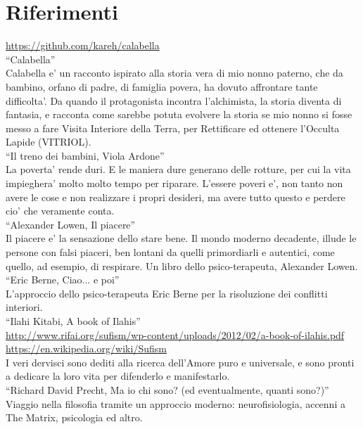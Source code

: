 \chapter{Riferimenti}
\label{chapRiferimenti}

  \url{https://github.com/kareh/calabella}\\
  ``Calabella''\\
  Calabella e' un racconto ispirato alla storia vera di mio nonno paterno, che da bambino, orfano di padre, di famiglia povera, ha dovuto affrontare tante difficolta'. Da quando il protagonista incontra l'alchimista, la storia diventa di fantasia, e racconta come sarebbe potuta evolvere la storia se mio nonno si fosse messo a fare Visita Interiore della Terra, per Rettificare ed ottenere l'Occulta Lapide (VITRIOL).\\

  ``Il treno dei bambini, Viola Ardone''\\
  La poverta' rende duri. E le maniera dure generano delle rotture, per cui la vita impieghera'
  molto molto tempo per riparare. L'essere poveri e', non tanto non avere le cose e non realizzare
  i propri desideri, ma avere tutto questo e perdere cio' che veramente conta.\\

  ``Alexander Lowen, Il piacere''\\
  Il piacere e' la sensazione dello stare bene. Il mondo moderno decadente, illude le persone
  con falsi piaceri, ben lontani da quelli primordiarli e autentici, come quello, ad esempio,
  di respirare. Un libro dello psico-terapeuta, Alexander Lowen.\\
  
  ``Eric Berne, Ciao... e poi''\\
  L'approccio dello psico-terapeuta Eric Berne per la risoluzione dei conflitti interiori.\\

  
  ``Ilahi Kitabi, A book of Ilahis''\\
  \url{http://www.rifai.org/sufism/wp-content/uploads/2012/02/a-book-of-ilahis.pdf}\\
  \url{https://en.wikipedia.org/wiki/Sufism}\\
  I veri dervisci sono dediti alla ricerca dell'Amore puro e universale, e sono pronti a
  dedicare la loro vita per difenderlo e manifestarlo.\\

  ``Richard David Precht, Ma io chi sono? (ed eventualmente, quanti sono?)''\\
  Viaggio nella filosofia tramite un approccio moderno: neurofisiologia, accenni a The Matrix, psicologia ed altro.\\
   
